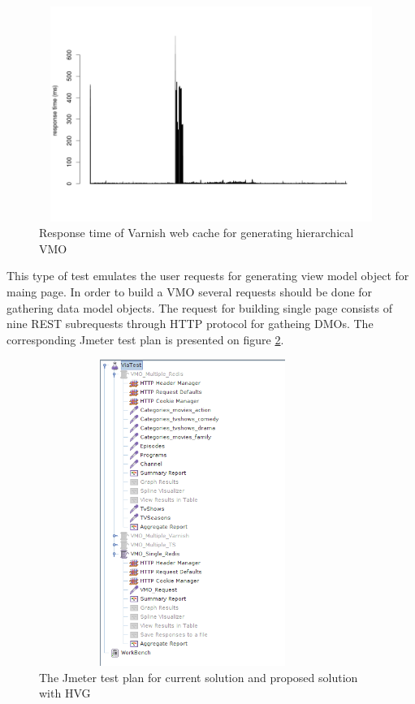 \begin{figure}[h!]
    \centering
    \includegraphics[width=15cm,height=7cm,keepaspectratio]{images/vmo_varnish_mult.png}
    \caption{Response time of Varnish web cache for generating hierarchical VMO}
    \label{fig:vmo_varnish_mult}
\end{figure}


This type of test emulates the user requests for generating view model object for maing page. In order to build a VMO several requests should be done for gathering data model objects. The request for building single page consists of nine REST subrequests through HTTP protocol for gatheing DMOs. The corresponding Jmeter test plan is presented on figure \ref{fig:vmo_testplan}.

\begin{figure}[h!]
    \centering
    \includegraphics[width=10cm,height=10cm,keepaspectratio]{images/vmo_testplan.png}
    \caption{The Jmeter test plan for current solution and proposed solution with HVG}
    \label{fig:vmo_testplan}
\end{figure}

